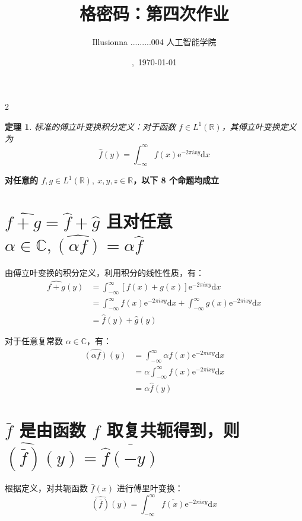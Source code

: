 \documentclass{article}
\title{格密码：第四次作业}
\author{Illusionna \quad 2025.........004 \quad 人工智能学院}
\date{\currenttime,\ \today}
\newcommand{\e}{\mathrm{e}}
\renewcommand{\d}{\mathrm{d}}
\newtheorem{theorem}{定理}
\begin{document}
\maketitle
\thispagestyle{empty}
\begin{spacing}{2}
    \tableofcontents
\end{spacing}
\thispagestyle{empty}
\clearpage
\setcounter{page}{1}



\begin{theorem}
    标准的傅立叶变换积分定义：对于函数 $f\in L^1(\mathbb{R})$，其傅立叶变换定义为
    \[ \hat{f}(y) = \int_{-\infty}^{\infty} f(x)\e^{-2\pi i xy} \d x \]
\end{theorem}



\noindent\textbf{对任意的 $f,g\in L^1(\mathbb{R}),\ x,y,z\in\mathbb{R}$，以下 8 个命题均成立}



\section{$\widehat{f+g} = \hat{f} + \hat{g}$ 且对任意 $\alpha \in \mathbb{C}, \widehat{(\alpha f)} = \alpha\hat{f}$}
由傅立叶变换的积分定义，利用积分的线性性质，有：
\begin{align*}
    \widehat{f+g}(y) &= \int_{-\infty}^{\infty} [f(x) + g(x)]\e^{-2\pi i xy} \d x
    \\
    &= \int_{-\infty}^{\infty} f(x)\e^{-2\pi i xy} \d x + \int_{-\infty}^{\infty} g(x)\e^{-2\pi i xy} \d x
    \\
    &= \hat{f}(y) + \hat{g}(y)
\end{align*}

对于任意复常数 $\alpha \in \mathbb{C}$，有：
\begin{align*}
    \widehat{(\alpha f)}(y) &= \int_{-\infty}^{\infty} \alpha f(x)\e^{-2\pi i xy} \d x
    \\
    &= \alpha \int_{-\infty}^{\infty} f(x)\e^{-2\pi i xy} \d x
    \\
    &= \alpha\hat{f}(y)
\end{align*}



\section{$\bar{f}$ 是由函数 $f$ 取复共轭得到，则 $\widehat{(\bar{f})}(y) = \overline{\hat{f}(-y)}$}
根据定义，对共轭函数 $\bar{f}(x)$ 进行傅里叶变换：
\[ \widehat{(\bar{f})}(y) = \int_{-\infty}^{\infty} \overline{f(x)}\e^{-2\pi i xy} \d x \]
\end{document}
